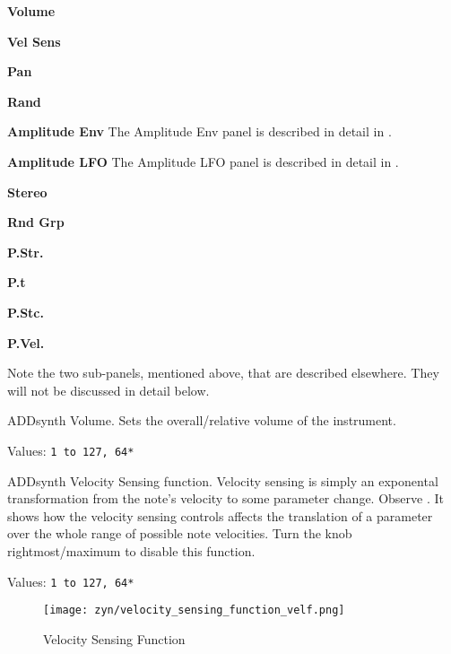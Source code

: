    \begin{enumber}
      \item \textbf{Volume}
      \item \textbf{Vel Sens}
      \item \textbf{Pan}
      \item \textbf{Rand}
      \item \textbf{Amplitude Env}
         The Amplitude Env panel is described in detail in
         .
      \item \textbf{Amplitude LFO}
         The Amplitude LFO panel is described in detail in
         .
      \item \textbf{Stereo}
      \item \textbf{Rnd Grp}
      \item \textbf{P.Str.}
      \item \textbf{P.t}
      \item \textbf{P.Stc.}
      \item \textbf{P.Vel.}
   \end{enumber}

   Note the two sub-panels, mentioned above, that are described elsewhere.
   They will not be discussed in detail below.

   \setcounter{ItemCounter}{0}      %

   ADDsynth Volume.
   Sets the overall/relative volume of the instrument.

   Values: \texttt{1 to 127, 64*}

   ADDsynth Velocity Sensing function.
   Velocity sensing is simply an exponental transformation from the note’s
   velocity to some parameter change.
   Observe .
   It shows how the velocity sensing controls affects the translation of a
   parameter over the whole range of possible note velocities.
   Turn the knob rightmost/maximum to disable this function.

   Values: \texttt{1 to 127, 64*}

\begin{figure}[H]
   \centering
   \texttt{[image: zyn/velocity\_sensing\_function\_velf.png]}
   \caption{Velocity Sensing Function}
   \label{fig:velocity_sensing_function}
\end{figure}

